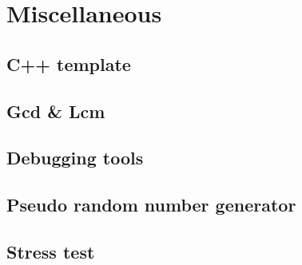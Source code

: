 \section{Miscellaneous}
\subsection{C++ template}
\raggedbottom
\hrulefill
\subsection{Gcd \& Lcm}
\raggedbottom
\hrulefill
\subsection{Debugging tools}
\raggedbottom
\hrulefill
\subsection{Pseudo random number generator}
\raggedbottom
\hrulefill
\subsection{Stress test}
\raggedbottom
\hrulefill
